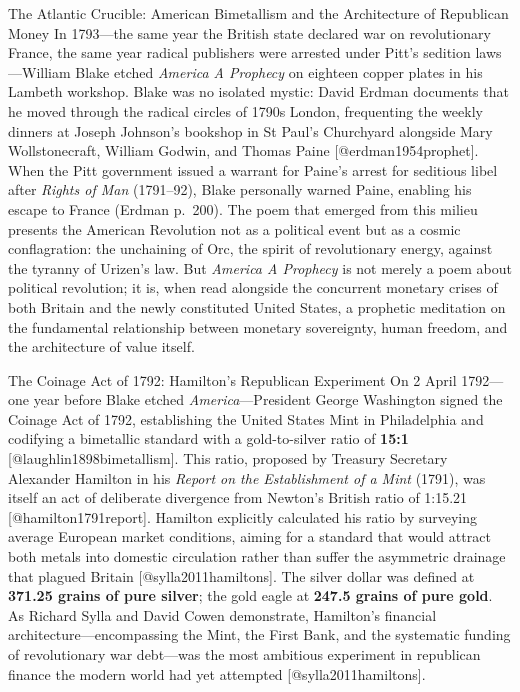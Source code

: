 \documentclass[
  ignorenonframetext,
]{beamer}
\author{\texorpdfstring{}{}}
\date{}
\begin{document}
\begin{frame}{The Atlantic Crucible: American Bimetallism and the
Architecture of Republican Money}
\protect{}\label{the-atlantic-crucible-american-bimetallism-and-the-architecture-of-republican-money}
In 1793---the same year the British state declared war on revolutionary
France, the same year radical publishers were arrested under Pitt's
sedition laws---William Blake etched \emph{America A Prophecy} on
eighteen copper plates in his Lambeth workshop. Blake was no isolated
mystic: David Erdman documents that he moved through the radical circles
of 1790s London, frequenting the weekly dinners at Joseph Johnson's
bookshop in St Paul's Churchyard alongside Mary Wollstonecraft, William
Godwin, and Thomas Paine {[}@erdman1954prophet{]}. When the Pitt
government issued a warrant for Paine's arrest for seditious libel after
\emph{Rights of Man} (1791--92), Blake personally warned Paine, enabling
his escape to France (Erdman p.~200). The poem that emerged from this
milieu presents the American Revolution not as a political event but as
a cosmic conflagration: the unchaining of Orc, the spirit of
revolutionary energy, against the tyranny of Urizen's law. But
\emph{America A Prophecy} is not merely a poem about political
revolution; it is, when read alongside the concurrent monetary crises of
both Britain and the newly constituted United States, a prophetic
meditation on the fundamental relationship between monetary sovereignty,
human freedom, and the architecture of value itself.

\begin{block}{The Coinage Act of 1792: Hamilton's Republican Experiment}
\protect{}\label{the-coinage-act-of-1792-hamiltons-republican-experiment}
On 2 April 1792---one year before Blake etched
\emph{America}---President George Washington signed the Coinage Act of
1792, establishing the United States Mint in Philadelphia and codifying
a bimetallic standard with a gold-to-silver ratio of \textbf{15:1}
{[}@laughlin1898bimetallism{]}. This ratio, proposed by Treasury
Secretary Alexander Hamilton in his \emph{Report on the Establishment of
a Mint} (1791), was itself an act of deliberate divergence from Newton's
British ratio of 1:15.21 {[}@hamilton1791report{]}. Hamilton explicitly
calculated his ratio by surveying average European market conditions,
aiming for a standard that would attract both metals into domestic
circulation rather than suffer the asymmetric drainage that plagued
Britain {[}@sylla2011hamiltons{]}. The silver dollar was defined at
\textbf{371.25 grains of pure silver}; the gold eagle at \textbf{247.5
grains of pure gold}. As Richard Sylla and David Cowen demonstrate,
Hamilton's financial architecture---encompassing the Mint, the First
Bank, and the systematic funding of revolutionary war debt---was the
most ambitious experiment in republican finance the modern world had yet
attempted {[}@sylla2011hamiltons{]}.


\end{block}
\end{frame}
\end{document}
